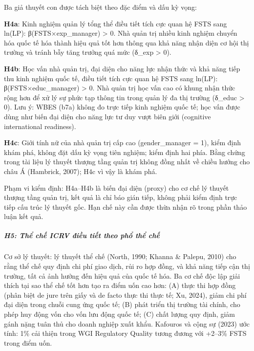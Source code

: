 \documentclass[
  a4paper,
  13pt]{extreport}
\begin{document}
Ba giả thuyết con được tách biệt theo đặc điểm và dấu kỳ vọng:

\textbf{H4a}: Kinh nghiệm quản lý tổng thể điều tiết tích cực quan hệ
FSTS sang ln(LP): β(FSTS×exp\_manager) \textgreater{} 0. Nhà quản trị
nhiều kinh nghiệm chuyển hóa quốc tế hóa thành hiệu quả tốt hơn thông
qua khả năng nhận diện cơ hội thị trường và tránh bẫy tăng trưởng quá
mức (δ\_exp \textgreater{} 0).

\textbf{H4b}: Học vấn nhà quản trị, đại diện cho năng lực nhận thức và
khả năng tiếp thu kinh nghiệm quốc tế, điều tiết tích cực quan hệ FSTS
sang ln(LP): β(FSTS×educ\_manager) \textgreater{} 0. Nhà quản trị học
vấn cao có khung nhận thức rộng hơn để xử lý sự phức tạp thông tin trong
quản lý đa thị trường (δ\_educ \textgreater{} 0). Lưu ý: WBES (b7a)
không đo trực tiếp kinh nghiệm quốc tế; học vấn được dùng như biến đại
diện cho năng lực tư duy vượt biên giới (cognitive international
readiness).

\textbf{H4c}: Giới tính nữ của nhà quản trị cấp cao (gender\_manager =
1), kiểm định khám phá, không đặt dấu kỳ vọng tiên nghiệm; kiểm định hai
phía. Bằng chứng trong tài liệu lý thuyết thượng tầng quản trị không
đồng nhất về chiều hướng cho châu Á (Hambrick, 2007); H4c vì vậy là khám
phá.

Phạm vi kiểm định: H4a--H4b là biến đại diện (proxy) cho cơ chế lý
thuyết thượng tầng quản trị, kết quả là chỉ báo gián tiếp, không phải
kiểm định trực tiếp cấu trúc lý thuyết gốc. Hạn chế này cần được thừa
nhận rõ trong phần thảo luận kết quả.

\hypertarget{h5-thux1ec3-chux1ebf-icrv-ux111iux1ec1u-tiux1ebft-theo-phux1ed5-thux1ec3-chux1ebf}{%
\subparagraph{H5: Thể chế ICRV điều tiết theo phổ thể
chế}\label{h5-thux1ec3-chux1ebf-icrv-ux111iux1ec1u-tiux1ebft-theo-phux1ed5-thux1ec3-chux1ebf}}

Cơ sở lý thuyết: lý thuyết thể chế (North, 1990; Khanna \& Palepu, 2010)
cho rằng thể chế quy định chi phí giao dịch, rủi ro hợp đồng, và khả
năng tiếp cận thị trường, tất cả ảnh hưởng đến hiệu quả của quốc tế hóa.
Ba cơ chế độc lập giải thích tại sao thể chế tốt hơn tạo ra điểm uốn cao
hơn: (A) thực thi hợp đồng (phân biệt de jure trên giấy và de facto thực
thi thực tế; Xu, 2024), giảm chi phí đại diện trong chuỗi cung ứng quốc
tế; (B) phát triển thị trường tài chính, cho phép huy động vốn cho vốn
lưu động quốc tế; (C) chất lượng quy định, giảm gánh nặng tuân thủ cho
doanh nghiệp xuất khẩu. Kafouros và cộng sự (2023) ước tính: 1\% cải
thiện trong WGI Regulatory Quality tương đương với +2--3\% FSTS trong
điểm uốn.
\end{document}
